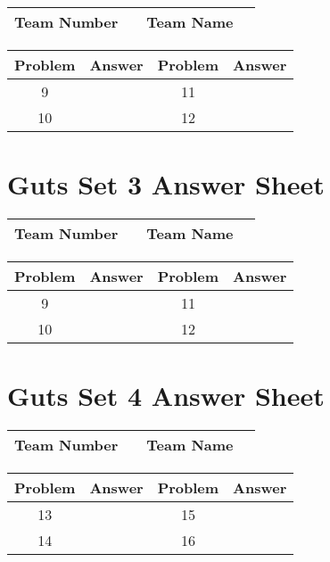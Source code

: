 \documentclass[14pt]{article}
\begin{document}
\begin{center}
\begin{tabular}{|r|r|r|r|}
\hline
	Team Number & \hspace{10em} &
	Team Name & \hspace{15em} \\ \hline
\end{tabular}
\end{center}
\begin{tabularx}{\textwidth}{|c|l|c|X|}\hline
	Problem & Answer & Problem & Answer \\\hline
	9 & \hspace{15em} & 11 & \\\hline
	10 & & 12 & \\\hline
\end{tabularx}

\vspace{30px}

\section*{Guts Set 3 Answer Sheet}

\begin{center}
\begin{tabular}{|r|r|r|r|}
\hline
	Team Number & \hspace{10em} &
	Team Name & \hspace{15em} \\ \hline
\end{tabular}
\end{center}
\begin{tabularx}{\textwidth}{|c|l|c|X|}\hline
	Problem & Answer & Problem & Answer \\\hline
	9 & \hspace{15em} & 11 & \\\hline
	10 & & 12 & \\\hline
\end{tabularx}

\section*{Guts Set 4 Answer Sheet}

\begin{center}
\begin{tabular}{|r|r|r|r|}
\hline
	Team Number & \hspace{10em} &
	Team Name & \hspace{15em} \\ \hline
\end{tabular}
\end{center}
\begin{tabularx}{\textwidth}{|c|l|c|X|}\hline
	Problem & Answer & Problem & Answer \\\hline
	13 & \hspace{15em} & 15 & \\\hline
	14 & & 16 & \\\hline
\end{tabularx}
\end{document}
